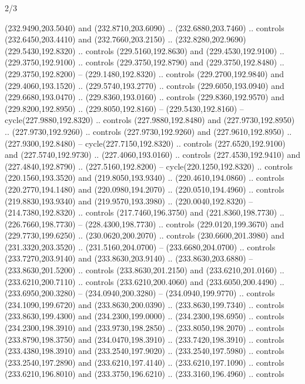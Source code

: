\begin{flagdescription}{2/3}
\begin{scope}[xshift=0.5\flaglength,yshift=0.5\flagwidth,scale=\flagwidth/259.2]
\begin{scope}[y=0.8pt, x=0.8pt, yscale=-1,shift={(-243,-162)}]
      (232.9490,203.5040) and (232.8710,203.6090) .. (232.6880,203.7460) .. controls
      (232.6450,203.4410) and (232.7660,203.2150) ..
      (232.8280,202.9690)(229.5430,192.8320) .. controls (229.5160,192.8630) and
      (229.4530,192.9100) .. (229.3750,192.9100) .. controls (229.3750,192.8790) and
      (229.3750,192.8480) .. (229.3750,192.8200) -- (229.1480,192.8320) .. controls
      (229.2700,192.9840) and (229.4060,193.1520) .. (229.5740,193.2770) .. controls
      (229.6050,193.0940) and (229.6680,193.0470) .. (229.8360,193.0160) .. controls
      (229.8360,192.9570) and (229.8200,192.8950) .. (229.8050,192.8160) --
      (229.5430,192.8160) -- cycle(227.9880,192.8320) .. controls
      (227.9880,192.8480) and (227.9730,192.8950) .. (227.9730,192.9260) .. controls
      (227.9730,192.9260) and (227.9610,192.8950) .. (227.9300,192.8480) --
      cycle(227.7150,192.8320) .. controls (227.6520,192.9100) and
      (227.5740,192.9730) .. (227.4060,193.0160) .. controls (227.4530,192.9410) and
      (227.4840,192.8790) .. (227.5160,192.8200) -- cycle(220.1250,192.8320) ..
      controls (220.1560,193.3520) and (219.8050,193.9340) .. (220.4610,194.0860) ..
      controls (220.2770,194.1480) and (220.0980,194.2070) .. (220.0510,194.4960) ..
      controls (219.8830,193.9340) and (219.9570,193.3980) .. (220.0040,192.8320) --
      (214.7380,192.8320) .. controls (217.7460,196.3750) and (221.8360,198.7730) ..
      (226.7660,198.7730) -- (228.4300,198.7730) .. controls (229.0120,199.3670) and
      (229.7730,199.6250) .. (230.0620,200.2070) .. controls (230.6600,201.3980) and
      (231.3320,203.3520) .. (231.5160,204.0700) -- (233.6680,204.0700) .. controls
      (233.7270,203.9140) and (233.8630,203.9140) .. (233.8630,203.6880) --
      (233.8630,201.5200) .. controls (233.8630,201.2150) and (233.6210,201.0160) ..
      (233.6210,200.7110) .. controls (233.6210,200.4060) and (233.6050,200.4490) ..
      (233.6950,200.3280) -- (234.0940,200.3280) -- (234.0940,199.9770) .. controls
      (234.1090,199.6720) and (233.8630,200.0390) .. (233.8630,199.7340) .. controls
      (233.8630,199.4300) and (234.2300,199.0000) .. (234.2300,198.6950) .. controls
      (234.2300,198.3910) and (233.9730,198.2850) .. (233.8050,198.2070) .. controls
      (233.8790,198.3750) and (234.0470,198.3910) .. (233.7420,198.3910) .. controls
      (233.4380,198.3910) and (233.2540,197.9020) .. (233.2540,197.5980) .. controls
      (233.2540,197.2890) and (233.6210,197.4140) .. (233.6210,197.1090) .. controls
      (233.6210,196.8010) and (233.3750,196.6210) .. (233.3160,196.4960) .. controls

\end{scope}
\end{scope}
\end{flagdescription}
